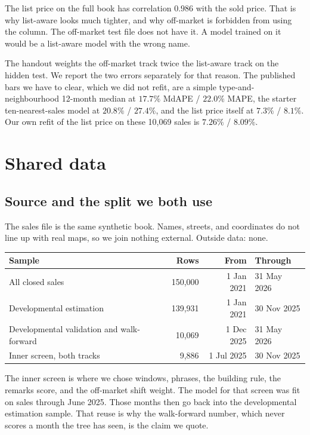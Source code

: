 \documentclass[11pt]{article}
\newcommand{\la}{list-aware}
\newcommand{\om}{off-market}
\begin{document}
The list price on the full book has correlation \(0.986\) with the sold price. That is why \la{} looks much tighter, and why \om{} is forbidden from using the column. The off-market test file does not have it. A model trained on it would be a list-aware model with the wrong name.

The handout weights the off-market track twice the list-aware track on the hidden test. We report the two errors separately for that reason. The published bars we have to clear, which we did not refit, are a simple type-and-neighbourhood 12-month median at \(17.7\%\) MdAPE / \(22.0\%\) MAPE, the starter ten-nearest-sales model at \(20.8\%\) / \(27.4\%\), and the list price itself at \(7.3\%\) / \(8.1\%\). Our own refit of the list price on these 10{,}069 sales is \(7.26\%\) / \(8.09\%\).

\section{Shared data}
\label{sec:data}

\subsection{Source and the split we both use}

The sales file is the same synthetic book. Names, streets, and coordinates do not line up with real maps, so we join nothing external. Outside data: none.

\begin{center}
\small
\begin{tabular}{lrrl}
\toprule
Sample & Rows & From & Through \\
\midrule
All closed sales & 150{,}000 & 1 Jan 2021 & 31 May 2026 \\
Developmental estimation & 139{,}931 & 1 Jan 2021 & 30 Nov 2025 \\
Developmental validation and walk-forward & 10{,}069 & 1 Dec 2025 & 31 May 2026 \\
Inner screen, both tracks & 9{,}886 & 1 Jul 2025 & 30 Nov 2025 \\
\bottomrule
\end{tabular}
\end{center}

The inner screen is where we chose windows, phrases, the building rule, the remarks score, and the off-market shift weight. The model for that screen was fit on sales through June 2025. Those months then go back into the developmental estimation sample. That reuse is why the walk-forward number, which never scores a month the tree has seen, is the claim we quote.
\end{document}
